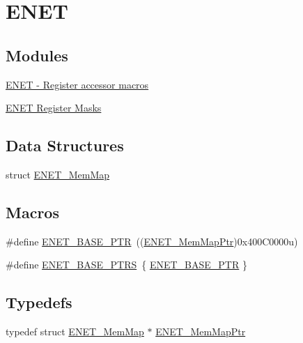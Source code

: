 \hypertarget{group___e_n_e_t___peripheral}{}\section{E\+N\+E\+T}
\label{group___e_n_e_t___peripheral}
\subsection*{Modules}
\begin{DoxyCompactItemize}
\item 
\hyperlink{group___e_n_e_t___register___accessor___macros}{E\+N\+E\+T -\/ Register accessor macros}
\item 
\hyperlink{group___e_n_e_t___register___masks}{E\+N\+E\+T Register Masks}
\end{DoxyCompactItemize}
\subsection*{Data Structures}
\begin{DoxyCompactItemize}
\item 
struct \hyperlink{struct_e_n_e_t___mem_map}{E\+N\+E\+T\+\_\+\+Mem\+Map}
\end{DoxyCompactItemize}
\subsection*{Macros}
\begin{DoxyCompactItemize}
\item 
\#define \hyperlink{group___e_n_e_t___peripheral_gab64a2d991cc2bd76dd55ee25a52dcb5c}{E\+N\+E\+T\+\_\+\+B\+A\+S\+E\+\_\+\+P\+T\+R}~((\hyperlink{group___e_n_e_t___peripheral_gad26854f6c554b38dabbfc21ef7040890}{E\+N\+E\+T\+\_\+\+Mem\+Map\+Ptr})0x400\+C0000u)
\item 
\#define \hyperlink{group___e_n_e_t___peripheral_gaa42b0a3bb4d738c4d78a36663b481ff8}{E\+N\+E\+T\+\_\+\+B\+A\+S\+E\+\_\+\+P\+T\+R\+S}~\{ \hyperlink{group___e_n_e_t___peripheral_gab64a2d991cc2bd76dd55ee25a52dcb5c}{E\+N\+E\+T\+\_\+\+B\+A\+S\+E\+\_\+\+P\+T\+R} \}
\end{DoxyCompactItemize}
\subsection*{Typedefs}
\begin{DoxyCompactItemize}
\item 
typedef struct \hyperlink{struct_e_n_e_t___mem_map}{E\+N\+E\+T\+\_\+\+Mem\+Map} $\ast$ \hyperlink{group___e_n_e_t___peripheral_gad26854f6c554b38dabbfc21ef7040890}{E\+N\+E\+T\+\_\+\+Mem\+Map\+Ptr}
\end{DoxyCompactItemize}


